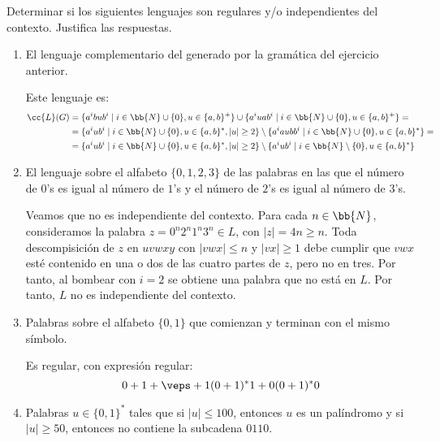 \documentclass[12pt]{article}
\begin{document}
    \begin{ejercicio}[2.5 puntos]
        Determinar si los siguientes lenguajes son regulares y/o independientes del contexto. Justifica las respuestas.
        \begin{enumerate}
            \item El lenguaje complementario del generado por la gramática del ejercicio anterior.
            
            Este lenguaje es:
            \begin{align*}
                \cc{L}(G)&=\{a^ibub^i\mid i\in \bb{N}\cup \{0\},u\in \{a,b\}^+\}
                \cup \{a^iuab^i\mid i\in \bb{N}\cup \{0\},u\in \{a,b\}^+\}
                =\\&= \{a^iub^i\mid i\in \bb{N}\cup \{0\},u\in \{a,b\}^*,|u|\geq 2\}
                \setminus \{a^i aub b^i\mid i\in \bb{N}\cup \{0\},u\in \{a,b\}^*\}
                =\\&= \{a^iub^i\mid i\in \bb{N}\cup \{0\},u\in \{a,b\}^*,|u|\geq 2\}
                \setminus \{a^i u b^i\mid i\in \bb{N}\setminus \{0\},u\in \{a,b\}^*\}
            \end{align*}

            \item El lenguaje sobre el alfabeto $\{0, 1, 2, 3\}$ de las palabras en las que el número de $0$'s es igual al número de $1$'s y el número de $2$'s es igual al número de $3$'s.
            
            Veamos que no es independiente del contexto. Para cada $n\in \bb{N}$, consideramos la palabra $z=0^n2^n1^n3^n\in L$, con $|z|=4n\geq n$.
            Toda descompisición de $z$ en $uvwxy$ con $|vwx|\leq n$ y $|vx|\geq 1$ debe cumplir que $vwx$ esté contenido en una o dos de las cuatro partes de $z$, pero no en tres. Por tanto, al bombear con $i=2$ se obtiene una palabra que no está en $L$. Por tanto, $L$ no es independiente del contexto.
            \item Palabras sobre el alfabeto $\{0, 1\}$ que comienzan y terminan con el mismo símbolo.
            
            Es regular, con expresión regular:
            \begin{equation*}
                0 + 1 + \veps + 1(0+1)^*1 + 0(0+1)^*0
            \end{equation*}
            \item Palabras $u \in \{0, 1\}^*$ tales que si $|u| \leq 100$, entonces $u$ es un palíndromo y si $|u| \geq 50$, entonces no contiene la subcadena $0110$.
            

\end{enumerate}
\end{ejercicio}
\end{document}
